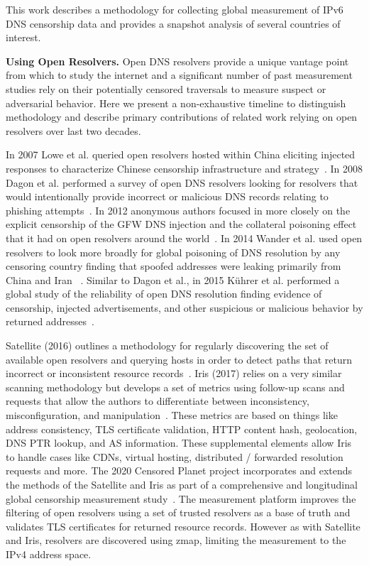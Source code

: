 

This work describes a methodology for collecting global measurement of IPv6 DNS
censorship data and provides a snapshot analysis of several countries of interest.

\textbf{Using Open Resolvers.}
Open DNS resolvers provide a unique vantage point from which to study the internet
and a significant number of past measurement studies rely on their potentially censored
traversals to measure suspect or adversarial behavior.  Here we present a
non-exhaustive timeline to distinguish methodology and describe primary
contributions of related work relying on open resolvers over last two decades.

In 2007 Lowe et al. queried open resolvers hosted within China
eliciting injected responses to characterize Chinese censorship infrastructure
and strategy~\cite{lowe2007great}. In 2008 Dagon et al.
performed a survey of open DNS resolvers looking for resolvers that would
intentionally provide incorrect or malicious DNS records relating to
phishing attempts~\cite{dagon2008corrupted}.
In 2012 anonymous authors focused in more closely on the explicit censorship of
the GFW DNS injection and the collateral poisoning effect that it had on open
resolvers around the world~\cite{nebuchadnezzar2012collateral}. In 2014 Wander et al.
used open resolvers to look more broadly for global poisoning of DNS resolution
by any censoring country finding that spoofed addresses were leaking primarily
from China and Iran ~\cite{wander2014measurement}. Similar to Dagon et al., in 2015
K{\"u}hrer et al. performed a global study of the reliability of open DNS resolution
finding evidence of censorship, injected advertisements, and other suspicious
or malicious behavior by returned addresses~\cite{kuhrer2015going}.

Satellite (2016) outlines a methodology for regularly discovering the set of
available open resolvers and querying hosts in order to detect paths
that return incorrect or inconsistent resource records~\cite{scott2016satellite}.
Iris (2017) relies on a very similar scanning methodology but develops a set of
metrics using follow-up scans and requests that allow the authors to differentiate
between inconsistency, misconfiguration, and manipulation~\cite{pearce2017global}.
These metrics are based
on things like address consistency, TLS certificate validation, HTTP content hash,
geolocation, DNS PTR lookup, and AS information. These supplemental elements
allow Iris to handle cases like CDNs, virtual hosting, distributed / forwarded
resolution requests and more. The 2020 Censored Planet project incorporates
and extends the methods of the Satellite and Iris as part of a comprehensive
and longitudinal global censorship measurement study~\cite{sundara2020censored}.
The measurement platform improves the filtering of open resolvers using a set of
trusted resolvers as a base of truth and validates TLS certificates for returned
resource records. However as with Satellite and Iris, resolvers are discovered
using zmap, limiting the measurement to the IPv4 address space.


